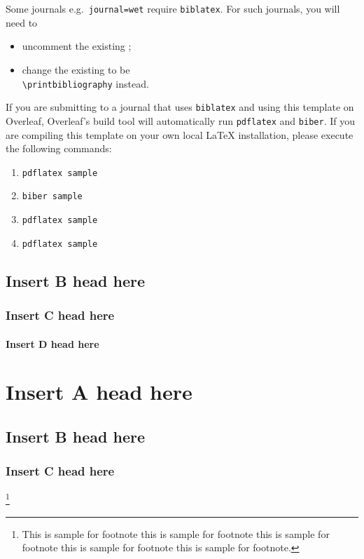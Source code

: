 \documentclass[journal=eds]{CAM-MODERN}%
\theoremstyle{definition}
\numberwithin{equation}{section}
\begin{document}
Some journals e.g.~\texttt{journal=wet} require \texttt{biblatex}. For such journals, you will need to
\begin{itemize}
    \item uncomment the existing \verb||;
    \item change the existing \verb|| to be\\
    \verb|\printbibliography| instead.
\end{itemize} 

If you are submitting to a journal that uses \texttt{biblatex} and using this template on Overleaf, Overleaf's build tool will automatically run \texttt{pdflatex} and \texttt{biber}. If you are compiling this template on your own local \LaTeX{} installation, please execute the following commands:
\begin{enumerate}
    \item \verb|pdflatex sample|
    \item \verb|biber sample|
    \item \verb|pdflatex sample|
    \item \verb|pdflatex sample|
\end{enumerate}

\subsection{Insert B head here}

\lipsum[2]

\subsubsection{Insert C head here}

\lipsum[3]

\paragraph{Insert D head here}

\lipsum[4]

\section{Insert A head here}
\subsection{Insert B head here}
\subsubsection{Insert C head here}
\lipsum[4]\footnote{This is sample for footnote this is sample for footnote this is sample for footnote  this is sample for footnote this is sample for footnote.}
\end{document}
